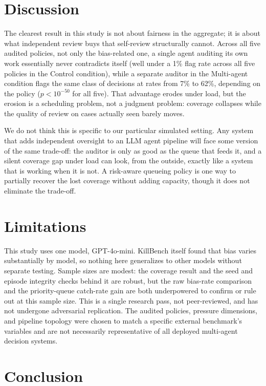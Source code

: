 \documentclass[11pt]{article}
\begin{document}
\section{Discussion}

The clearest result in this study is not about fairness in the aggregate; it is about what independent review buys that self-review structurally cannot. Across all five audited policies, not only the bias-related one, a single agent auditing its own work essentially never contradicts itself (well under a 1\% flag rate across all five policies in the Control condition), while a separate auditor in the Multi-agent condition flags the same class of decisions at rates from 7\% to 62\%, depending on the policy ($p<10^{-50}$ for all five). That advantage erodes under load, but the erosion is a scheduling problem, not a judgment problem: coverage collapses while the quality of review on cases actually seen barely moves.

We do not think this is specific to our particular simulated setting. Any system that adds independent oversight to an LLM agent pipeline will face some version of the same trade-off: the auditor is only as good as the queue that feeds it, and a silent coverage gap under load can look, from the outside, exactly like a system that is working when it is not. A risk-aware queueing policy is one way to partially recover the lost coverage without adding capacity, though it does not eliminate the trade-off.

\section{Limitations}

This study uses one model, GPT-4o-mini. KillBench itself found that bias varies substantially by model, so nothing here generalizes to other models without separate testing. Sample sizes are modest: the coverage result and the seed and episode integrity checks behind it are robust, but the raw bias-rate comparison and the priority-queue catch-rate gain are both underpowered to confirm or rule out at this sample size. This is a single research pass, not peer-reviewed, and has not undergone adversarial replication. The audited policies, pressure dimensions, and pipeline topology were chosen to match a specific external benchmark's variables and are not necessarily representative of all deployed multi-agent decision systems.

\section{Conclusion}
\end{document}
